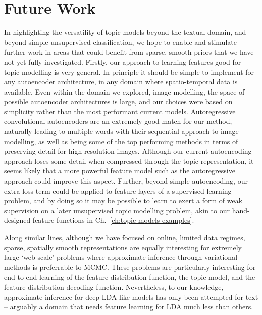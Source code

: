 \section{Future Work} \label{sec:conclusion-future-work}
In highlighting the versatility of topic models beyond the textual domain, and beyond simple unsupervised classification, we hope to enable and stimulate further work in areas that could benefit from sparse, smooth priors that we have not yet fully investigated. Firstly, our approach to learning features good for topic modelling is very general. In principle it should be simple to implement for any autoencoder architecture, in any domain where spatio-temporal data is available. Even within the domain we explored, image modelling, the space of possible autoencoder architectures is large, and our choices were based on simplicity rather than the most performant current models. Autoregressive convolutional autoencoders are an extremely good match for our method, naturally leading to multiple words with their sequential approach to image modelling, as well as being some of the top performing methods in terms of preserving detail for high-resolution images. Although our current autoencoding approach loses some detail when compressed through the topic representation, it seems likely that a more powerful feature model such as the autoregressive approach could improve this aspect. Further, beyond simple autoencoding, our extra loss term could be applied to feature layers of a supervised learning problem, and by doing so it may be possible to learn to exert a form of weak supervision on a later unsupervised topic modelling problem, akin to our hand-designed feature functions in Ch.~\ref{ch:topic-models-examples}.

Along similar lines, although we have focused on online, limited data regimes, sparse, spatially smooth representations are equally interesting for extremely large `web-scale' problems where approximate inference through variational methods is preferrable to MCMC. These problems are particularly interesting for end-to-end learning of the feature distribution function, the topic model, and the feature distribution decoding function. Nevertheless, to our knowledge, approximate inference for deep LDA-like models has only been attempted for text -- arguably a domain that needs feature learning for LDA much less than others.

